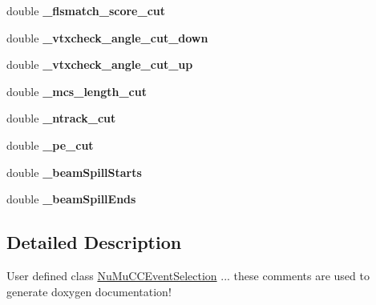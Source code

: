 \begin{DoxyCompactItemize}
\item 
\hypertarget{classubana_1_1NuMuCCEventSelection_ab3b2bd085e4d94041d4606004e7e7c84}{double {\bfseries \-\_\-flsmatch\-\_\-score\-\_\-cut}}\label{classubana_1_1NuMuCCEventSelection_ab3b2bd085e4d94041d4606004e7e7c84}

\item 
\hypertarget{classubana_1_1NuMuCCEventSelection_ab3d603d87565634367e9c1b0a432e768}{double {\bfseries \-\_\-vtxcheck\-\_\-angle\-\_\-cut\-\_\-down}}\label{classubana_1_1NuMuCCEventSelection_ab3d603d87565634367e9c1b0a432e768}

\item 
\hypertarget{classubana_1_1NuMuCCEventSelection_aecedda900c5db3ae97a2a56d2b2ca0ce}{double {\bfseries \-\_\-vtxcheck\-\_\-angle\-\_\-cut\-\_\-up}}\label{classubana_1_1NuMuCCEventSelection_aecedda900c5db3ae97a2a56d2b2ca0ce}

\item 
\hypertarget{classubana_1_1NuMuCCEventSelection_a1b57d12027f73b53cfd959f041854891}{double {\bfseries \-\_\-mcs\-\_\-length\-\_\-cut}}\label{classubana_1_1NuMuCCEventSelection_a1b57d12027f73b53cfd959f041854891}

\item 
\hypertarget{classubana_1_1NuMuCCEventSelection_aedd8196829ba2459ec0cf3784f67bcb9}{double {\bfseries \-\_\-ntrack\-\_\-cut}}\label{classubana_1_1NuMuCCEventSelection_aedd8196829ba2459ec0cf3784f67bcb9}

\item 
\hypertarget{classubana_1_1NuMuCCEventSelection_abad9fc8197e1d13ee7f35551cedeacaa}{double {\bfseries \-\_\-pe\-\_\-cut}}\label{classubana_1_1NuMuCCEventSelection_abad9fc8197e1d13ee7f35551cedeacaa}

\item 
\hypertarget{classubana_1_1NuMuCCEventSelection_af08a0c70e21fbef10efd34dde2fe7d83}{double {\bfseries \-\_\-beam\-Spill\-Starts}}\label{classubana_1_1NuMuCCEventSelection_af08a0c70e21fbef10efd34dde2fe7d83}

\item 
\hypertarget{classubana_1_1NuMuCCEventSelection_a2a52cfd60173c161bf9169cf26964eea}{double {\bfseries \-\_\-beam\-Spill\-Ends}}\label{classubana_1_1NuMuCCEventSelection_a2a52cfd60173c161bf9169cf26964eea}

\end{DoxyCompactItemize}


\subsection{Detailed Description}
User defined class \hyperlink{classubana_1_1NuMuCCEventSelection}{Nu\-Mu\-C\-C\-Event\-Selection} ... these comments are used to generate doxygen documentation! 

